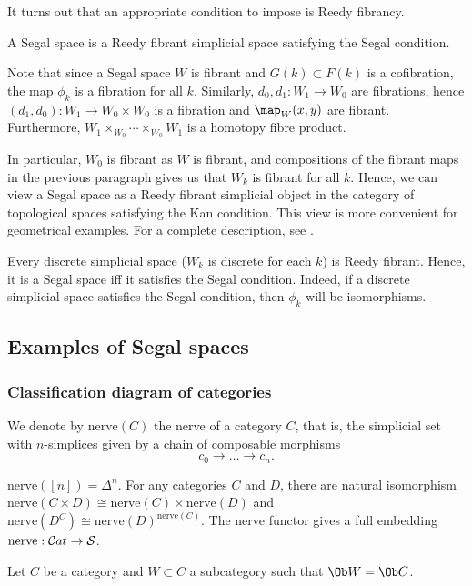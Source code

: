 It turns out that an appropriate condition to impose is Reedy fibrancy.
\begin{defin}
A Segal space is a Reedy fibrant simplicial space satisfying the Segal condition.
\end{defin}
Note that since a Segal space $W$ is fibrant and $G(k)\subset F(k)$ is a cofibration, the map $\phi_k$ is a fibration for all $k$. Similarly, $d_0,d_1:W_1\to W_0$ are fibrations, hence $(d_1,d_0):W_1\to W_0\times W_0$ is a fibration and $\map_W(x,y)$ are fibrant. Furthermore, $W_1\times_{W_0}\cdots\times_{W_0}W_1$ is a homotopy fibre product.

In particular, $W_0$ is fibrant as $W$ is fibrant, and compositions of the fibrant maps in the previous paragraph gives us that $W_k$ is fibrant for all $k$. Hence, we can view a Segal space as a Reedy fibrant simplicial object in the category of topological spaces satisfying the Kan condition. This view is more convenient for geometrical examples. For a complete description, see \cite{lurietft}.

\begin{eg}
Every discrete simplicial space ($W_k$ is discrete for each $k$) is Reedy fibrant. Hence, it is a Segal space iff it satisfies the Segal condition. Indeed, if a discrete simplicial space satisfies the Segal condition, then $\phi_k$ will be isomorphisms.
\end{eg}

\subsection{Examples of Segal spaces}\label{egss}
\subsubsection{Classification diagram of categories}
We denote by $\mathrm{nerve}(C)$ the nerve of a category $C$, that is, the simplicial set with $n$-simplices given by a chain of composable morphisms
$$c_0\to\ldots\to c_n.$$
\begin{prop}\label{nerve}
$\mathrm{nerve}([n])=\Delta^n$. For any categories $C$ and $D$, there are natural isomorphism $\mathrm{nerve}(C\times D)\cong\mathrm{nerve}(C)\times\mathrm{nerve}(D)$ and $\mathrm{nerve}(D^C)\cong\mathrm{nerve}(D)^{\mathrm{nerve}(C)}$. The nerve functor gives a full embedding $\mathrm{nerve}:{\cal C}at\to\mathcal S$.
\end{prop}

Let $C$ be a category and $W\subset C$ a subcategory such that $\Ob W=\Ob C$. 

